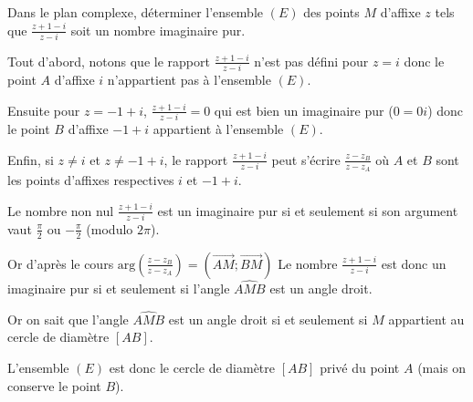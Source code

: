 
%
Dans le plan complexe, déterminer l'ensemble $\left(E\right)$ des points $M$ d'affixe $z$ tels que $\frac{ z+1-i }{ z-i }$ soit un nombre imaginaire pur.
\begin{corrige}
     Tout d'abord, notons que le rapport  $\frac{ z+1-i }{ z-i }$ n'est pas défini pour $z=i$ donc le point $A$ d'affixe $i$ n'appartient pas à l'ensemble $\left(E\right)$.
     \par
     Ensuite pour $ z=-1+i $, $\frac{ z+1-i }{ z-i }=0$ qui est bien un imaginaire pur ($0=0i$) donc le point $B$ d'affixe $-1+i$ appartient à l'ensemble $\left(E\right)$.
     \par
     Enfin, si $z\neq i$ et $z\neq -1+i$, le rapport $\frac{ z+1-i }{ z-i }$ peut s'écrire $\frac{z-z_{B}}{z-z_{A}}$ où $A$ et $B$ sont les points d'affixes respectives $i$ et $-1+i$.
     \par
     Le nombre non nul $\frac{ z+1-i }{ z-i }$ est un imaginaire pur si et seulement si son argument vaut $\frac{\pi }{2}$ ou $-\frac{\pi }{2}$ (modulo $2\pi $).
     \par
     Or d'après le cours $\text{arg}\left(\frac{z-z_{B}}{z-z_{A}}\right)=\left(\overrightarrow{AM};\overrightarrow{BM}\right)$
     Le nombre $\frac{ z+1-i }{ z-i }$ est donc  un imaginaire pur si et seulement si l'angle $\widehat{AMB}$ est un angle droit.
     \par
     Or on sait que l'angle $\widehat{AMB}$ est un angle droit si et seulement si $M$ appartient au cercle de diamètre $\left[AB\right]$.
     \par
     L'ensemble $\left(E\right)$ est donc le cercle de diamètre $\left[AB\right]$ privé du point $A$ (mais on conserve le point $B$).

\begin{center}
\end{center}
\end{corrige}
